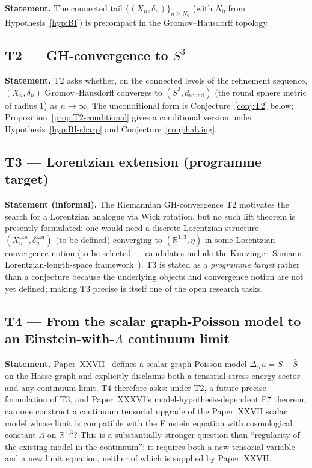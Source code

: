 \documentclass[12pt]{article}
\theoremstyle{definition}
\theoremstyle{remark}
\newcommand{\Gcal}{\mathcal{G}}
\begin{document}
\textbf{Statement.} The connected tail $\{(X_n, \delta_n)\}_{n \geq N_0}$ (with $N_0$ from Hypothesis~\ref{hyp:BI}) is precompact in the Gromov--Hausdorff topology.

\subsection*{T2 --- GH-convergence to $S^3$}

\textbf{Statement.} T2 asks whether, on the connected levels of the refinement sequence, $(X_n, \delta_n)$ Gromov--Hausdorff converges to $(S^3, d_{\mathrm{round}})$ (the round sphere metric of radius $1$) as $n \to \infty$. The unconditional form is Conjecture~\ref{conj:T2} below; Proposition~\ref{prop:T2-conditional} gives a conditional version under Hypothesis~\ref{hyp:BI-sharp} and Conjecture~\ref{conj:halving}.

\subsection*{T3 --- Lorentzian extension (programme target)}

\textbf{Statement (informal).} The Riemannian GH-convergence T2 motivates the search for a Lorentzian analogue via Wick rotation, but no such lift theorem is presently formulated: one would need a discrete Lorentzian structure $(X_n^{\mathrm{Lor}}, \delta_n^{\mathrm{Lor}})$ (to be defined) converging to $(\mathbb{R}^{1,3}, \eta)$ in some Lorentzian convergence notion (to be selected --- candidates include the Kunzinger--S\"amann Lorentzian-length-space framework~\citep{Kunzinger2018}). T3 is stated as a \emph{programme target} rather than a conjecture because the underlying objects and convergence notion are not yet defined; making T3 precise is itself one of the open research tasks.

\subsection*{T4 --- From the scalar graph-Poisson model to an Einstein-with-$\Lambda$ continuum limit}

\textbf{Statement.} Paper~XXVII~\citep{SmartXXVII} defines a scalar graph-Poisson model $\Delta_\Gcal u = S - \bar S$ on the Hasse graph and explicitly disclaims both a tensorial stress-energy sector and any continuum limit. T4 therefore asks: under T2, a future precise formulation of T3, and Paper~XXXVI's model-hypothesis-dependent F7 theorem, can one construct a continuum tensorial upgrade of the Paper~XXVII scalar model whose limit is compatible with the Einstein equation with cosmological constant $\Lambda$ on $\mathbb{R}^{1,3}$? This is a substantially stronger question than ``regularity of the existing model in the continuum''; it requires both a new tensorial variable and a new limit equation, neither of which is supplied by Paper~XXVII.
\end{document}
